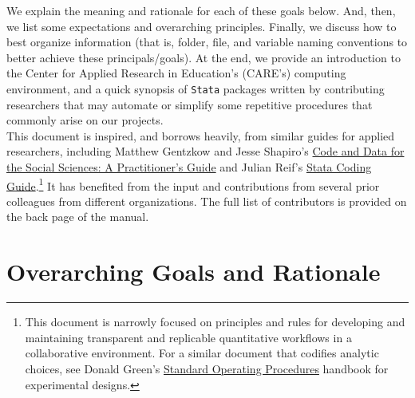 \documentclass[11pt]{article}
\begin{document}
We explain the meaning and rationale for each of these goals below. And, then, we list some expectations and overarching principles. Finally, we discuss how to best organize information (that is, folder, file, and variable naming conventions to better achieve these principals/goals). At the end, we provide an introduction to the Center for Applied Research in Education's (CARE's) computing environment, and a quick synopsis of \texttt{Stata} packages written by contributing researchers that may automate or simplify some repetitive procedures that commonly arise on our projects.\\

This document is inspired, and borrows heavily, from similar guides for applied researchers, including Matthew Gentzkow and Jesse Shapiro's \href{https://www.brown.edu/Research/Shapiro/pdfs/CodeAndData.pdf}{Code and Data for the Social Sciences: A Practitioner's Guide} and Julian Reif's \href{https://julianreif.com/guide/}{Stata Coding Guide}.\footnote{This document is narrowly focused on principles and rules for developing and maintaining transparent and replicable quantitative workflows in a collaborative environment. For a similar document that codifies analytic choices, see Donald Green's \href{https://alexandercoppock.com/Green-Lab-SOP/Green_Lab_SOP.html}{Standard Operating Procedures} handbook for experimental designs.} It has benefited from the input and contributions from several prior colleagues from different organizations. The full list of contributors is provided on the back page of the manual.

\section{Overarching Goals and Rationale} \label{sec:rationale}
\end{document}
